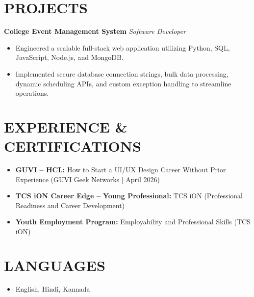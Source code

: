 \documentclass{article}
\begin{document}
\section*{PROJECTS}
\textbf{College Event Management System} \hfill \textit{Software Developer}
\begin{itemize}[leftmargin=1.5em, itemsep=2pt]
    \item Engineered a scalable full-stack web application utilizing Python, SQL, JavaScript, Node.js, and MongoDB.
    \item Implemented secure database connection strings, bulk data processing, dynamic scheduling APIs, and custom exception handling to streamline operations.
\end{itemize}

\section*{EXPERIENCE \& CERTIFICATIONS}
\begin{itemize}[leftmargin=1.5em, itemsep=3pt]
    \item \textbf{GUVI -- HCL:} How to Start a UI/UX Design Career Without Prior Experience (GUVI Geek Networks | April 2026)
    \item \textbf{TCS iON Career Edge -- Young Professional:} TCS iON (Professional Readiness and Career Development)
    \item \textbf{Youth Employment Program:} Employability and Professional Skills (TCS iON)
\end{itemize}

\section*{LANGUAGES}
\begin{itemize}[leftmargin=1.5em, itemsep=2pt]
    \item English, Hindi, Kannada
\end{itemize}
\end{document}

